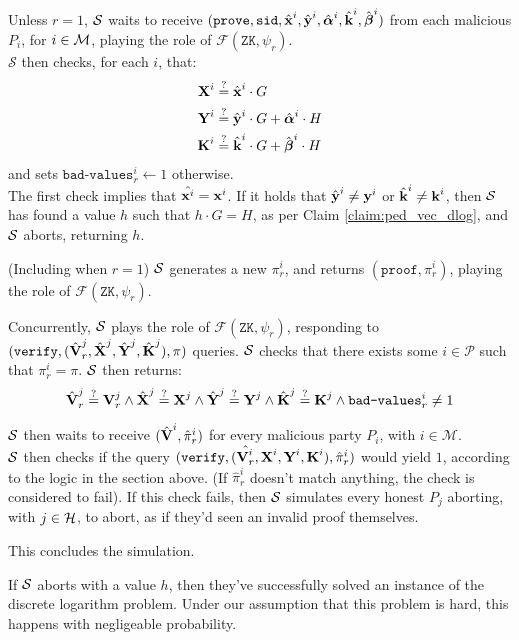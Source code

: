 Unless $r = 1$, $\mathcal{S}$ waits to receive 
$(\texttt{prove}, \texttt{sid}, \hat{\textbf{x}}^i, \hat{\textbf{y}}^i, \hat{\boldsymbol{\alpha}}^i, \hat{\textbf{k}}^i, \hat{\boldsymbol{\beta}}^i)$
from each malicious $P_i$, for $i \in \mathcal{M}$, playing the role of $\mathcal{F}(\texttt{ZK}, \psi_r)$.\\
$\mathcal{S}$ then checks, for each $i$, that:
$$
\begin{aligned}
\textbf{X}^i &\stackrel{?}{=} \hat{\textbf{x}}^i \cdot G\\
\textbf{Y}^i &\stackrel{?}{=} \hat{\textbf{y}}^i \cdot G + \hat{\boldsymbol{\alpha}}^i \cdot H\\
\textbf{K}^i &\stackrel{?}{=} \hat{\textbf{k}}^i \cdot G + \hat{\boldsymbol{\beta}}^i \cdot H
\end{aligned}
$$
and sets $\texttt{bad-values}^i_r \gets 1$ otherwise.\\
The first check implies that $\hat{\textbf{x}^i} = \textbf{x}^i$. If it holds that
$\hat{\textbf{y}}^i \neq \textbf{y}^i$ or $\hat{\textbf{k}}^i \neq \textbf{k}^i$, then $\mathcal{S}$ has
found a value $h$ such that $h \cdot G = H$, as per Claim \ref{claim:ped_vec_dlog},
and $\mathcal{S}$ aborts, returning $h$.

(Including when $r = 1$) $\mathcal{S}$ generates a new $\pi^i_r$, and returns $(\texttt{proof}, \pi^i_r)$,
playing the role of $\mathcal{F}(\texttt{ZK}, \psi_r)$.

Concurrently, $\mathcal{S}$ plays the role of $\mathcal{F}(\texttt{ZK}, \psi_r)$,
responding to $(\texttt{verify}, (\hat{\textbf{V}}^j_r, \hat{\textbf{X}}^j, \hat{\textbf{Y}}^j, \hat{\textbf{K}}^j), \pi)$
queries. $\mathcal{S}$ checks that there exists some $i \in \mathcal{P}$ such that
$\pi^i_r = \pi$. $\mathcal{S}$ then returns:
$$
\hat{\textbf{V}}^j_r \stackrel{?}{=} \textbf{V}^j_r \land
\hat{\textbf{X}}^j \stackrel{?}{=} \textbf{X}^j \land
\hat{\textbf{Y}}^j \stackrel{?}{=} \textbf{Y}^j \land
\hat{\textbf{K}}^j \stackrel{?}{=} \textbf{K}^j \land
\texttt{bad-values}^i_r \neq 1
$$

$\mathcal{S}$ then waits to receive $(\hat{\textbf{V}}^i, \hat{\pi}^i_r)$ for
every malicious party $P_i$, with ${i \in \mathcal{M}}$.\\
$\mathcal{S}$ then checks if the query $(\texttt{verify}, (\hat{\textbf{V}^i_r}, \textbf{X}^i, \textbf{Y}^i, \textbf{K}^i), \hat{\pi}^i_r)$
would yield $1$, according to the logic in the section above.
(If $\hat{\pi}^i_r$ doesn't match anything, the check is considered to fail).
If this check fails, then $\mathcal{S}$ simulates every honest $P_j$ aborting, with $j \in \mathcal{H}$,
to abort, as if they'd seen an invalid proof themselves.

This concludes the simulation.

If $\mathcal{S}$ aborts with a value $h$, then they've successfully
solved an instance of the discrete logarithm problem. Under our
assumption that this problem is hard, this happens with negligeable
probability.

